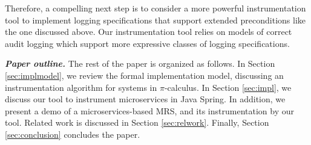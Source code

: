 Therefore, a compelling next step is to consider a more powerful instrumentation tool to implement logging specifications that support extended preconditions like the one discussed above. Our instrumentation tool relies on models of correct audit logging which support more expressive classes of logging specifications.




\textbf{\textit{Paper outline.}}
The rest of the paper is organized as follows. In Section \ref{sec:implmodel}, we review the formal implementation model, discussing an instrumentation algorithm for systems in $\pi$-calculus. In Section \ref{sec:impl}, we discuss our tool to instrument microservices in Java Spring. In addition, we present a demo of a microservices-based MRS, and its instrumentation by our tool. 
Related work is discussed in Section \ref{sec:relwork}. Finally, Section \ref{sec:conclusion} concludes the paper.